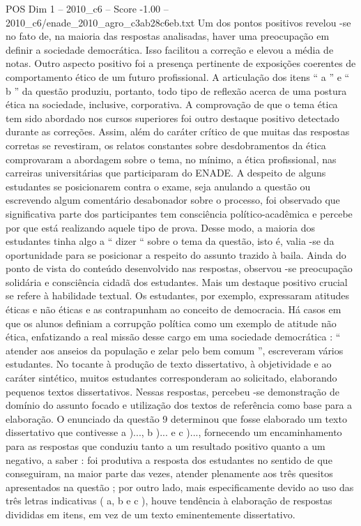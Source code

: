 \begin{textsample}{POS Dim 1 – 2010\_c6 – Score -1.00 – 2010\_c6/enade\_2010\_agro\_c3ab28c6eb.txt}
Um dos pontos positivos revelou -se no fato de, na maioria das respostas analisadas, haver uma preocupação em definir a sociedade democrática.
Isso facilitou a correção e elevou a média de notas.
Outro aspecto positivo foi a presença pertinente de exposições coerentes de comportamento ético de um futuro profissional.
A articulação dos itens “ a ” e “ b ” da questão produziu, portanto, todo tipo de reflexão acerca de uma postura ética na sociedade, inclusive, corporativa.
A comprovação de que o tema ética tem sido abordado nos cursos superiores foi outro destaque positivo detectado durante as correções.
Assim, além do caráter crítico de que muitas das respostas corretas se revestiram, os relatos constantes sobre desdobramentos da ética comprovaram a abordagem sobre o tema, no mínimo, a ética profissional, nas carreiras universitárias que participaram do ENADE.
A despeito de alguns estudantes se posicionarem contra o exame, seja anulando a questão ou escrevendo algum comentário desabonador sobre o processo, foi observado que significativa parte dos participantes tem consciência político-acadêmica e percebe por que está realizando aquele tipo de prova.
Desse modo, a maioria dos estudantes tinha algo a “ dizer “ sobre o tema da questão, isto é, valia -se da oportunidade para se posicionar a respeito do assunto trazido à baila.
Ainda do ponto de vista do conteúdo desenvolvido nas respostas, observou -se preocupação solidária e consciência cidadã dos estudantes.
Mais um destaque positivo crucial se refere à habilidade textual.
Os estudantes, por exemplo, expressaram atitudes éticas e não éticas e as contrapunham ao conceito de democracia.
Há casos em que os alunos definiam a corrupção política como um exemplo de atitude não ética, enfatizando a real missão desse cargo em uma sociedade democrática : “ atender aos anseios da população e zelar pelo bem comum ”, escreveram vários estudantes.
No tocante à produção de texto dissertativo, à objetividade e ao caráter sintético, muitos estudantes corresponderam ao solicitado, elaborando pequenos textos dissertativos.
Nessas respostas, percebeu -se demonstração de domínio do assunto focado e utilização dos textos de referência como base para a elaboração.
O enunciado da questão 9 determinou que fosse elaborado um texto dissertativo que contivesse a )..., b )... e c )..., fornecendo um encaminhamento para as respostas que conduziu tanto a um resultado positivo quanto a um negativo, a saber : foi produtiva a resposta dos estudantes no sentido de que conseguiram, na maior parte das vezes, atender plenamente aos três quesitos apresentados na questão ; por outro lado, mais especificamente devido ao uso das três letras indicativas ( a, b e c ), houve tendência à elaboração de respostas divididas em itens, em vez de um texto eminentemente dissertativo.

\end{textsample}
